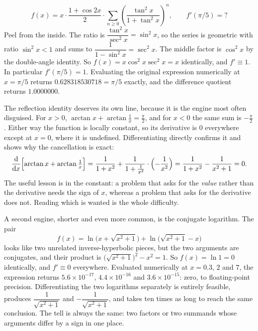 \begin{worked}
\[
f(x)=x\cdot\frac{1+\cos 2x}{2}\cdot\sum_{n\geq0}\left(\frac{\tan^{2}x}{1+\tan^{2}x}\right)^{n},
\qquad f'(\pi/5)=?
\]
Peel from the inside. The ratio is $\dfrac{\tan^{2}x}{\sec^{2}x}=\sin^{2}x$, so the series is geometric with ratio $\sin^{2}x<1$ and sums to $\dfrac{1}{1-\sin^{2}x}=\sec^{2}x$. The middle factor is $\cos^{2}x$ by the double-angle identity. So $f(x)=x\cos^{2}x\sec^{2}x=x$ identically, and $f'\equiv1$. In particular $f'(\pi/5)=1$. Evaluating the original expression numerically at $x=\pi/5$ returns $0.628318530718=\pi/5$ exactly, and the difference quotient returns $1.0000000$.

The reflection identity deserves its own line, because it is the engine most often disguised. For $x>0$, $\arctan x+\arctan\tfrac1x=\tfrac\pi2$, and for $x<0$ the same sum is $-\tfrac\pi2$. Either way the function is locally constant, so its derivative is $0$ everywhere except at $x=0$, where it is undefined. Differentiating directly confirms it and shows why the cancellation is exact:
\[
\frac{\mathrm{d}}{\mathrm{d}x}\Bigl[\arctan x+\arctan\tfrac1x\Bigr]=\frac{1}{1+x^{2}}+\frac{1}{1+\tfrac1{x^{2}}}\cdot\Bigl(-\frac{1}{x^{2}}\Bigr)=\frac{1}{1+x^{2}}-\frac{1}{x^{2}+1}=0 .
\]
The useful lesson is in the constant: a problem that asks for the \emph{value} rather than the derivative needs the sign of $x$, whereas a problem that asks for the derivative does not. Reading which is wanted is the whole difficulty.

A second engine, shorter and even more common, is the conjugate logarithm. The pair
\[
f(x)=\ln\bigl(x+\sqrt{x^{2}+1}\bigr)+\ln\bigl(\sqrt{x^{2}+1}-x\bigr)
\]
looks like two unrelated inverse-hyperbolic pieces, but the two arguments are conjugates, and their product is $\bigl(\sqrt{x^{2}+1}\bigr)^{2}-x^{2}=1$. So $f(x)=\ln 1=0$ identically, and $f'\equiv0$ everywhere. Evaluated numerically at $x=0.3$, $2$ and $7$, the expression returns $5.6\times10^{-17}$, $4.4\times10^{-16}$ and $3.6\times10^{-15}$: zero, to floating-point precision. Differentiating the two logarithms separately is entirely feasible, produces $\dfrac{1}{\sqrt{x^{2}+1}}$ and $-\dfrac{1}{\sqrt{x^{2}+1}}$, and takes ten times as long to reach the same conclusion. The tell is always the same: two factors or two summands whose arguments differ by a sign in one place.


\end{worked}
